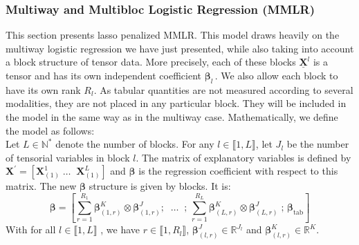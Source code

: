 \documentclass[preprint,12pt]{elsarticle}
\begin{document}
\subsubsection{Multiway and Multibloc Logistic Regression (MMLR)}

\noindent This section presents lasso penalized MMLR. This model draws heavily on the multiway logistic regression we have just presented, while also taking into account a block structure of tensor data. More precisely, each of these blocks $\underline{\mathbf{X}}^{l}$  is a tensor and has its own independent coefficient $\bm{\beta}_l \,$. We also allow each block to have its own rank $R_l$. As tabular quantities are not measured according to several modalities, they are not placed in any particular block. They will be included in the model in the same way as in the multiway case. Mathematically, we define the model as follows:\\
\indent Let $L \in \mathbb{N}^{*}$ denote the number of blocks. For any $l \in \llbracket 1, L \rrbracket$, let $J_l$ be the number of tensorial variables in block $l$. The matrix of explanatory variables is defined by $\mathbf{X}^{'} = [\mathbf{X}^1_{(1)} \; \hdots \; \; \mathbf{X}^L_{(1)}] $ and $\bm{\beta}$ is the regression coefficient with respect to this matrix. The new $\bm{\beta}$ structure is given by blocks. It is:
\begin{equation}
    \bm{\beta} = \left[ \sum\limits_{r = 1}^{R_1} \bm{\beta}_{(1,r)}^K \otimes \bm{\beta}_{(1,r)}^J;   \; \; \hdots  \; \; ;\, \sum\limits_{r = 1}^{R_L}\bm{\beta}_{(L,r)}^K \otimes \bm{\beta}_{(L,r)}^J\; ;\,\bm{\beta}_{\text{tab}}   \right]
\end{equation}
With for all $l \in \llbracket 1,L \rrbracket$ , we have $r \in \llbracket 1, R_l\rrbracket$,  $\bm{\beta}_{(l,r)}^J \in \mathbb{R}^{J_l}$ and $\bm{\beta}_{(l,r)}^K \in \mathbb{R}^{K}$. \\
\end{document}
